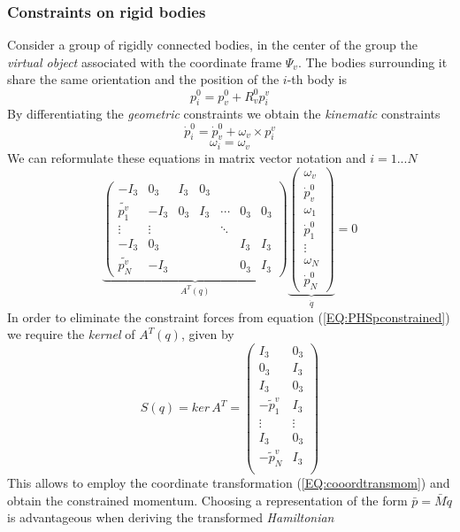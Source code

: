 \documentclass[a4paper,twoside, openright,12pt]{report}
\begin{document}
\subsubsection{Constraints on rigid bodies}
Consider a group of rigidly connected bodies, in the center of the group the \emph{virtual object} associated with the coordinate frame $\Psi_v$. The bodies surrounding it share the same orientation and the position of the $i$-th body is 
\[p_i^0 = p_v^0 + R_v^0 p_i^v\]
By differentiating the \emph{geometric} constraints we obtain the \emph{kinematic} constraints
\[\dot{p}_i^0 = \dot{p}_v^0 + \omega_v \times p_i^v\]
\[\omega_i = \omega_v\]
We can reformulate these equations in matrix vector notation and $i=1...N$
\begin{equation}
\underbrace{\begin{pmatrix}
-I_3 & 0_3 & I_3 & 0_3 &  &  &  \\
\tilde{p_1^v} & -I_3 & 0_3 & I_3 & \cdots & 0_3 & 0_3 \\ \vdots & \vdots \ & & & \ddots &  &  \\
-I_3 & 0_3 & & & & I_3 & I_3 \\
\tilde{p_N^v} & -I_3 & & & & 0_3 & I_3
\end{pmatrix}}_{A^T(q)}
\underbrace{\begin{pmatrix}
\omega_v \\ \dot{p}_v^0 \\ \omega_1 \\ \dot{p}_1^0 \\ \vdots \\ \omega_N \\ \dot{p}_N^0
\end{pmatrix}}_{\dot{q}} = 0
\end{equation}
In order to eliminate the constraint forces from equation (\ref{EQ:PHSpconstrained}) we require the \emph{kernel} of $A^T(q)$, given by
\[S(q) = ker \, A^T = \begin{pmatrix}
I_3 & 0_3 \\
0_3 & I_3 \\
I_3 & 0_3 \\
-\tilde{p}_1^v & I_3 \\
\vdots & \vdots \\
I_3 & 0_3 \\
-\tilde{p}_N^v& I_3 \\
\end{pmatrix}\]
This allows to employ the coordinate transformation (\ref{EQ:cooordtransmom}) and obtain the constrained momentum. Choosing a representation of the form $\bar{p} = \bar{M}\dot{q} $ is advantageous when deriving the transformed \emph{Hamiltonian}
\end{document}
